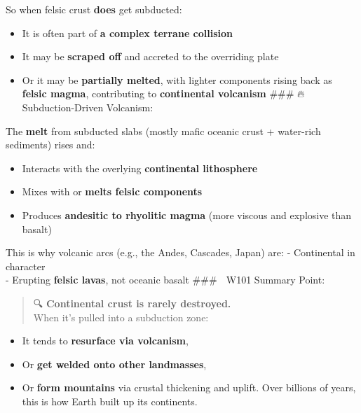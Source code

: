 \documentclass[
  letterpaper,
]{book}
\providecommand{\tightlist}{%
  \setlength{\itemsep}{0pt}\setlength{\parskip}{0pt}}
\begin{document}
So when felsic crust \textbf{does} get subducted:

\begin{itemize}
\tightlist
\item
  It is often part of \textbf{a complex terrane collision}\\
\item
  It may be \textbf{scraped off} and accreted to the overriding plate\\
\item
  Or it may be \textbf{partially melted}, with lighter components rising
  back as \textbf{felsic magma}, contributing to \textbf{continental
  volcanism} \#\#\# 🔥 Subduction-Driven Volcanism:
\end{itemize}

The \textbf{melt} from subducted slabs (mostly mafic oceanic crust +
water-rich sediments) rises and:

\begin{itemize}
\tightlist
\item
  Interacts with the overlying \textbf{continental lithosphere}\\
\item
  Mixes with or \textbf{melts felsic components}\\
\item
  Produces \textbf{andesitic to rhyolitic magma} (more viscous and
  explosive than basalt)
\end{itemize}

This is why volcanic arcs (e.g., the Andes, Cascades, Japan) are: -
Continental in character\\
- Erupting \textbf{felsic lavas}, not oceanic basalt \#\#\# 🧭 W101
Summary Point:

\begin{quote}
🔍 \textbf{Continental crust is rarely destroyed.}\\
When it's pulled into a subduction zone:
\end{quote}

\begin{itemize}
\tightlist
\item
  It tends to \textbf{resurface via volcanism},\\
\item
  Or \textbf{get welded onto other landmasses},\\
\item
  Or \textbf{form mountains} via crustal thickening and uplift. Over
  billions of years, this is how Earth built up its continents.
\end{itemize}
\end{document}
